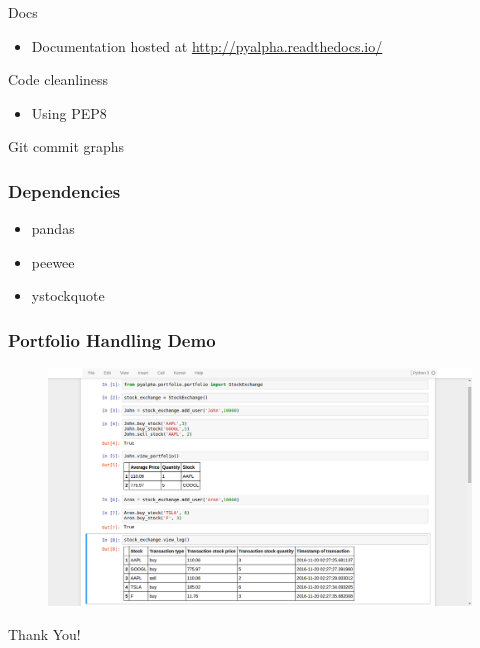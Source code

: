 \documentclass[serif,mathserif]{beamer}
\begin{document}
    \begin{frame}{Docs}
    
        \begin{itemize}
            \item Documentation hosted at \url{http://pyalpha.readthedocs.io/}
        \end{itemize}
        
    \end{frame}
    
    \begin{frame}{Code cleanliness}
        
        \begin{itemize}
            \item Using PEP8
        \end{itemize}
        
    \end{frame}
    
    \begin{frame}{Git commit graphs}
    
        
    \end{frame}

    \begin{frame}

        \frametitle{Dependencies}

        \begin{itemize}
            \item pandas
            \item peewee
            \item ystockquote
        \end{itemize}

    \end{frame}

    \begin{frame}

        \frametitle{Portfolio Handling Demo}

        \begin{figure}[h]
            \centering
            \includegraphics[width=\linewidth]{portfolio.png}
        \end{figure}

    \end{frame}

    \begin{frame}
        \centering \huge{Thank You!}
    \end{frame}
\end{document}
